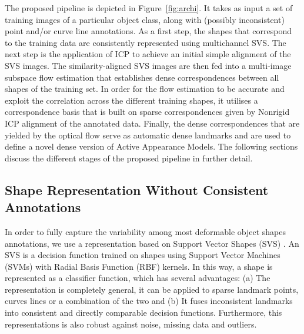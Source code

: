 The proposed pipeline is depicted in Figure~\ref{fig:archi}. It takes as input a set of training images of a particular object class, along with (possibly inconsistent) point and/or curve line annotations.
As a first step, the shapes that correspond to the training data are consistently represented using multichannel SVS.
The next step is the application of ICP to achieve an initial simple alignment of the SVS images.
The similarity-aligned SVS images are then fed into a multi-image subspace flow estimation that establishes dense correspondences between all shapes of the training set. In order for the flow estimation to be accurate and exploit the correlation across the different training shapes, it utilises a correspondence basis that is built on sparse correspondences given by Nonrigid ICP alignment of the annotated data. Finally, the dense correspondences that are yielded by the optical flow serve as automatic dense landmarks and are used to define a novel dense version of Active Appearance Models. The following sections discuss the different stages of the proposed pipeline in further detail.

\subsection{Shape Representation Without Consistent Annotations}
\label{sec:svs}

In order to fully capture the variability among most deformable object shapes annotations, we use a representation based on Support Vector Shapes (SVS) \cite{Nguyen2013}. An SVS is a decision function trained on shapes using Support Vector Machines (SVMs) with  Radial Basis Function (RBF) kernels. In this way, a shape is represented as a classifier function, which has several advantages: (a) The representation is completely general, \eg it can be applied to sparse landmark points, curves lines or a combination of the two and (b) It fuses inconsistent landmarks into consistent and directly comparable decision functions. Furthermore, this representations is also robust against noise, missing data and outliers.

